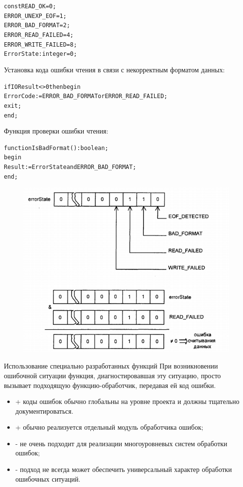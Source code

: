 \documentclass{beamer}
\begin{document}
\begin{frame}[fragile]
\begin{alltt}
const READ\_OK             = 0;
      ERROR\_UNEXP\_EOF     = 1;
      ERROR\_BAD\_FORMAT    = 2;
      ERROR\_READ\_FAILED   = 4;
      ERROR\_WRITE\_FAILED  = 8;
  ErrorState: integer = 0; 
\end{alltt}
Установка кода ошибки чтения в связи с некорректным форматом данных:
\begin{alltt}
  if IOResult <> 0 then begin
    ErrorCode := ERROR\_BAD\_FORMAT or ERROR\_READ\_FAILED;
    exit;
  end; 
\end{alltt}
Функция проверки ошибки чтения:
\begin{alltt}
function IsBadFormat(): boolean;
begin
  Result := ErrorState and ERROR\_BAD\_FORMAT;
end; 
\end{alltt}
\end{frame}

\begin{frame}
\begin{figure}[h]
\centering
\includegraphics[scale=0.6]{images/lec08-pic03.png}
\end{figure}
\end{frame}

\begin{frame}{Использование специально разработанных функций}
При возникновении ошибочной ситуации функция, диагностировавшая эту ситуацию, просто вызывает подходящую функцию-обработчик, передавая ей код ошибки. 

\begin{itemize}
\item + коды ошибок обычно глобальны на уровне проекта и должны тщательно документироваться. 
\item + обычно реализуется отдельный модуль обработчика ошибок;
\item - не очень подходит для реализации многоуровневых систем обработки ошибок;
\item - подход не всегда может обеспечить универсальный характер обработки ошибочных ситуаций.
\end{itemize}
\end{frame}
\end{document}
